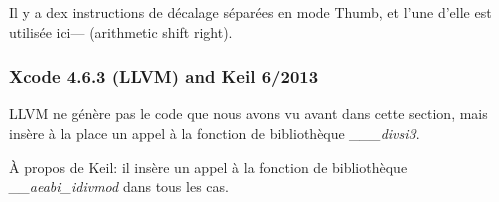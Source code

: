 
Il y a dex instructions de décalage séparées en mode Thumb, et l'une d'elle est
utilisée ici--- (arithmetic shift right).

\subsubsection{\NonOptimizing Xcode 4.6.3 (LLVM) and Keil 6/2013}

LLVM \NonOptimizing
ne génère pas le code que nous avons vu avant dans cette section, mais insère à la
place un appel à la fonction de bibliothèque \emph{\_\_\_divsi3}.

À propos de Keil: il insère un appel à la fonction de bibliothèque \emph{\_\_aeabi\_idivmod}
dans tous les cas.
